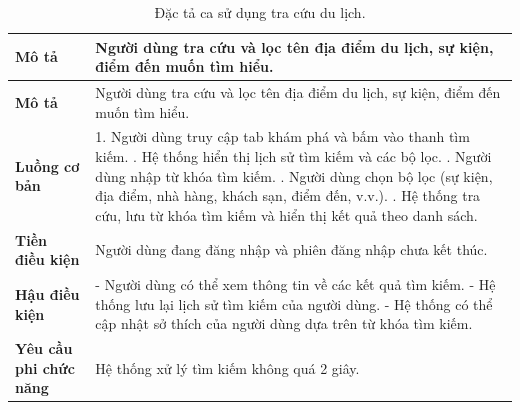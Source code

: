 \begin{longtable}{| p{4cm} | p{\dimexpr\linewidth-4cm-4\tabcolsep} |} %
    \caption{Đặc tả ca sử dụng tra cứu du lịch.} %
    \label{tab:uc_search_spec} \\ %

    \hline
    \textbf{Mô tả} & Người dùng tra cứu và lọc tên địa điểm du lịch, sự kiện, điểm đến muốn tìm hiểu. \\
    \hline
    \endfirsthead %

    \hline
    \textbf{Mô tả} & Người dùng tra cứu và lọc tên địa điểm du lịch, sự kiện, điểm đến muốn tìm hiểu. \\
    \hline
    \endhead

    \hline 
    \endfoot

    \hline %
    \endlastfoot

    \textbf{Luồng cơ bản} & 1. Người dùng truy cập tab khám phá và bấm vào thanh tìm kiếm. \newline
                           2. Hệ thống hiển thị lịch sử tìm kiếm và các bộ lọc. \newline
                           3. Người dùng nhập từ khóa tìm kiếm. \newline
                           4. Người dùng chọn bộ lọc (sự kiện, địa điểm, nhà hàng, khách sạn, điểm đến, v.v.). \newline
                           5. Hệ thống tra cứu, lưu từ khóa tìm kiếm và hiển thị kết quả theo danh sách. \\
    \hline
    \textbf{Tiền điều kiện} & Người dùng đang đăng nhập và phiên đăng nhập chưa kết thúc. \\
    \hline
    \textbf{Hậu điều kiện} & - Người dùng có thể xem thông tin về các kết quả tìm kiếm.\newline
                           - Hệ thống lưu lại lịch sử tìm kiếm của người dùng. \newline
                           - Hệ thống có thể cập nhật sở thích của người dùng dựa trên từ khóa tìm kiếm. \\
    \hline
    \textbf{Yêu cầu phi chức năng} & Hệ thống xử lý tìm kiếm không quá 2 giây. \\

\end{longtable}

